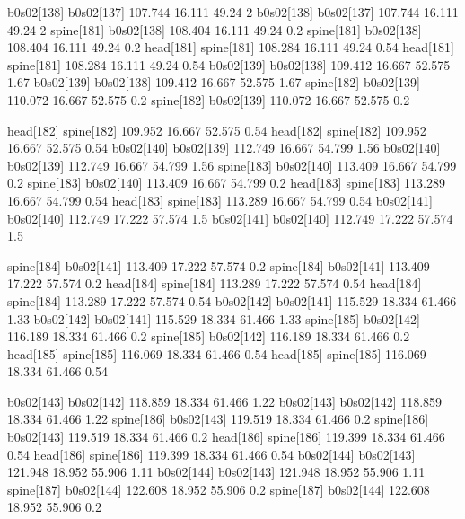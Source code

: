 b0s02[138]    b0s02[137]    107.744    16.111    49.24    2
b0s02[138]    b0s02[137]    107.744    16.111    49.24    2
spine[181]    b0s02[138]    108.404    16.111    49.24    0.2
spine[181]    b0s02[138]    108.404    16.111    49.24    0.2
head[181]    spine[181]    108.284    16.111    49.24    0.54
head[181]    spine[181]    108.284    16.111    49.24    0.54
b0s02[139]    b0s02[138]    109.412    16.667    52.575    1.67
b0s02[139]    b0s02[138]    109.412    16.667    52.575    1.67
spine[182]    b0s02[139]    110.072    16.667    52.575    0.2
spine[182]    b0s02[139]    110.072    16.667    52.575    0.2


head[182]    spine[182]    109.952    16.667    52.575    0.54
head[182]    spine[182]    109.952    16.667    52.575    0.54
b0s02[140]    b0s02[139]    112.749    16.667    54.799    1.56
b0s02[140]    b0s02[139]    112.749    16.667    54.799    1.56
spine[183]    b0s02[140]    113.409    16.667    54.799    0.2
spine[183]    b0s02[140]    113.409    16.667    54.799    0.2
head[183]    spine[183]    113.289    16.667    54.799    0.54
head[183]    spine[183]    113.289    16.667    54.799    0.54
b0s02[141]    b0s02[140]    112.749    17.222    57.574    1.5
b0s02[141]    b0s02[140]    112.749    17.222    57.574    1.5


spine[184]    b0s02[141]    113.409    17.222    57.574    0.2
spine[184]    b0s02[141]    113.409    17.222    57.574    0.2
head[184]    spine[184]    113.289    17.222    57.574    0.54
head[184]    spine[184]    113.289    17.222    57.574    0.54
b0s02[142]    b0s02[141]    115.529    18.334    61.466    1.33
b0s02[142]    b0s02[141]    115.529    18.334    61.466    1.33
spine[185]    b0s02[142]    116.189    18.334    61.466    0.2
spine[185]    b0s02[142]    116.189    18.334    61.466    0.2
head[185]    spine[185]    116.069    18.334    61.466    0.54
head[185]    spine[185]    116.069    18.334    61.466    0.54


b0s02[143]    b0s02[142]    118.859    18.334    61.466    1.22
b0s02[143]    b0s02[142]    118.859    18.334    61.466    1.22
spine[186]    b0s02[143]    119.519    18.334    61.466    0.2
spine[186]    b0s02[143]    119.519    18.334    61.466    0.2
head[186]    spine[186]    119.399    18.334    61.466    0.54
head[186]    spine[186]    119.399    18.334    61.466    0.54
b0s02[144]    b0s02[143]    121.948    18.952    55.906    1.11
b0s02[144]    b0s02[143]    121.948    18.952    55.906    1.11
spine[187]    b0s02[144]    122.608    18.952    55.906    0.2
spine[187]    b0s02[144]    122.608    18.952    55.906    0.2


